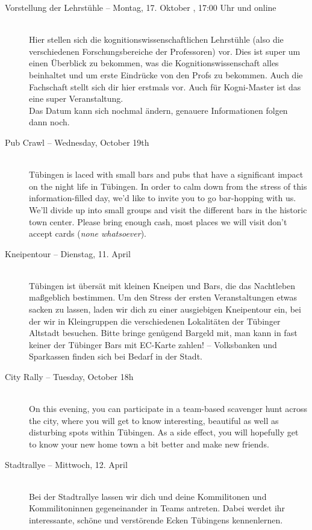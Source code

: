 \begin{description}
\ifkogwiss
	\item[Vorstellung der Lehrstühle -- Montag, 17. Oktober \YEAR, 17:00 Uhr und online]\ \\
	Hier stellen sich die kognitionswissenschaftlichen Lehrstühle (also die verschiedenen Forschungsbereiche der Professoren) vor. Dies ist super um einen Überblick zu bekommen, was die Kognitionswissenschaft alles beinhaltet und um erste Eindrücke von den Profs zu bekommen. Auch die Fachschaft stellt sich dir hier erstmals vor. %
	Auch für Kogni-Master ist das eine super Veranstaltung. \\
	Das Datum kann sich nochmal ändern, genauere Informationen folgen dann noch.
\fi

\ifml
	\item[Pub Crawl -- Wednesday, October 19th \YEAR]~\\%
	Tübingen is laced with small bars and pubs that have a significant impact on the night life in Tübingen.
	In order to calm down from the stress of this information-filled day, we'd like to invite you to go bar-hopping with us.
	We'll divide up into small groups and visit the different bars in the historic town center.
	Please bring enough cash, most places we will visit don't accept cards (\emph{none whatsoever}).
\else
	\item[Kneipentour -- Dienstag, 11. April \YEAR]~\\%
	Tübingen ist übersät mit kleinen Kneipen und Bars, die das Nachtleben maßgeblich bestimmen.
	Um den Stress der ersten Veranstaltungen etwas sacken zu lassen, laden wir dich zu einer ausgiebigen Kneipentour ein,
	bei der wir in Kleingruppen die verschiedenen Lokalitäten der Tübinger Altstadt besuchen.
	Bitte bringe genügend Bargeld mit, man kann in fast keiner der Tübinger Bars mit EC-Karte zahlen! -- Volksbanken und Sparkassen finden sich bei Bedarf in der Stadt.
\fi

\ifml
	\item[City Rally -- Tuesday, October 18h \YEAR]~\\%
	On this evening, you can participate in a team-based scavenger hunt across the city,
	where you will get to know interesting, beautiful as well as disturbing spots within Tübingen.
	As a side effect, you will hopefully get to know your new home town a bit better and make new friends.
\else
	\item[Stadtrallye -- Mittwoch, 12. April \YEAR]~\\%
	Bei der Stadtrallye lassen wir dich und deine Kommilitonen und Kommilitoninnen gegeneinander in Teams antreten.
	Dabei werdet ihr interessante, schöne und verstörende Ecken Tübingens kennenlernen.
\fi


\end{description}
